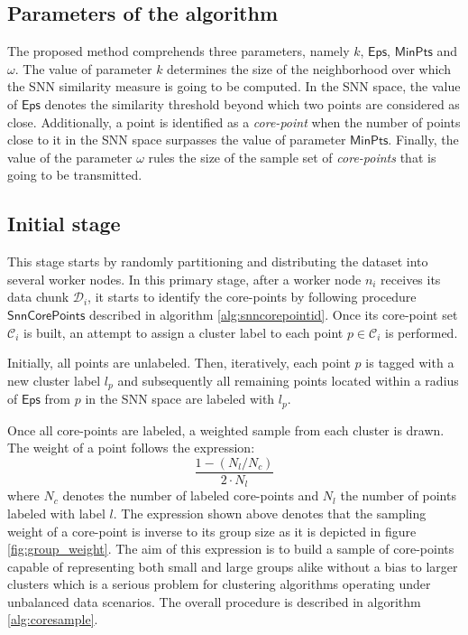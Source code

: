 \documentclass[a4paper]{article}
\begin{document}
\subsection*{Parameters of the algorithm}
The proposed method comprehends three parameters, namely $k$, $\mathsf{Eps}$, $\mathsf{MinPts}$ and $\omega$. The value of parameter $k$ determines the size of the neighborhood over which the SNN similarity measure is going to be computed. In the SNN space, the value of $\mathsf{Eps}$ denotes the similarity threshold beyond which two points are considered as close. Additionally, a point is identified as a \textit{core-point} when the number of points close to it in the SNN space surpasses the value of parameter $\mathsf{MinPts}$. Finally, the value of the  parameter $\omega$ rules the size of the sample set of \textit{core-points} that is going to be transmitted.

\subsection*{Initial stage}
This stage starts by randomly partitioning and distributing the dataset into several worker nodes.
In this primary stage, after a worker node $n_i$ receives its data chunk $\mathcal{D}_i$, it starts to identify the core-points by following procedure $\mathsf{SnnCorePoints}$ described in algorithm \ref{alg:snncorepointid}. 
Once its core-point set $\mathcal{C}_i$ is built, an attempt to assign a cluster label to each point $p\in \mathcal{C}_i$ is performed.

Initially, all points are unlabeled. Then, iteratively, each point $p$ is tagged with a new cluster label $l_p$ and subsequently all remaining points located within a radius of $\mathsf{Eps}$ from $p$ in the SNN space are labeled with $l_p$.

Once all core-points are labeled, a weighted sample from each cluster is drawn. The weight of a point follows the expression:\[\dfrac{1 - ( N_l/N_c ) }{2\cdot N_l}\] where $N_c$ denotes the number of labeled core-points and $N_l$ the number of points labeled with label $l$. The expression shown above denotes that the sampling weight of a core-point is inverse to its group size as it is depicted in figure \ref{fig:group_weight}. The aim of this expression is to build a sample of core-points capable of representing both small and large groups alike without a bias to larger clusters which is a serious problem for clustering algorithms operating under unbalanced data scenarios.
The overall procedure is described in algorithm \ref{alg:coresample}. 
\end{document}
